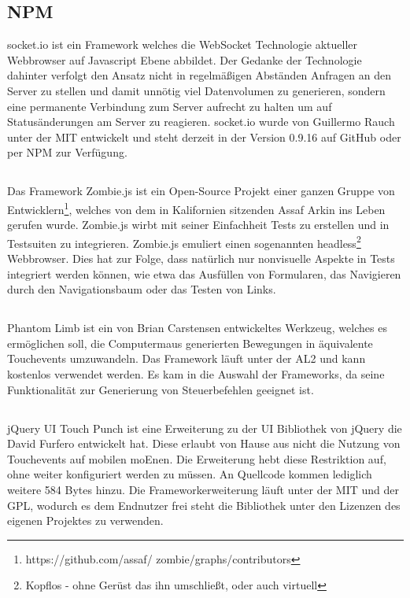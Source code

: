 	\subsection{NPM }
	socket.io ist ein \Gls{Framework} welches die WebSocket Technologie aktueller \Gls{Webbrowser} auf \Gls{Javascript} Ebene abbildet. Der Gedanke der Technologie dahinter verfolgt den Ansatz nicht in regelmäßigen Abständen Anfragen an den Server zu stellen und damit unnötig viel Datenvolumen zu generieren, sondern eine permanente Verbindung zum Server aufrecht zu halten um auf Statusänderungen am Server zu reagieren. socket.io wurde von Guillermo Rauch unter der \Gls{MIT} entwickelt und steht derzeit in der Version 0.9.16 auf GitHub oder per \Gls{NPM} zur Verfügung.
	
	\subsection{}
	Das \Gls{Framework} Zombie.js ist ein Open-Source Projekt einer ganzen Gruppe von Entwicklern\footnote{https://github.com/assaf/	zombie/graphs/contributors}, welches von dem in Kalifornien sitzenden Assaf Arkin ins Leben gerufen wurde. Zombie.js wirbt mit 	seiner Einfachheit \Gls{Test}s zu erstellen und in \Gls{Test}suiten zu integrieren. Zombie.js emuliert einen sogenannten headless\footnote{Kopflos - ohne Gerüst das ihn umschließt, oder auch virtuell} \Gls{Webbrowser}. Dies hat zur Folge, dass natürlich nur nonvisuelle Aspekte in \Gls{Test}s integriert werden können, wie etwa das Ausfüllen von Formularen, das Navigieren durch den Navigationsbaum oder das Testen von Links.

	\subsection{}
	Phantom Limb ist ein von Brian Carstensen entwickeltes Werkzeug, welches es ermöglichen soll, die \Gls{Computer}maus generierten Bewegungen in äquivalente \mbox{Touchevents} umzuwandeln. Das \Gls{Framework} läuft unter der \Gls{AL2} und kann kostenlos 	verwendet werden. Es kam in die Auswahl der \Gls{Framework}s, da seine Funktionalität zur Generierung von Steuerbefehlen geeignet ist.
	
	\subsection{}
	jQuery UI Touch Punch ist eine Erweiterung zu der UI Bibliothek von jQuery die David Furfero entwickelt hat. Diese erlaubt von 	Hause aus nicht die Nutzung von Touchevents auf mobilen \Gls{moEn}en. Die Erweiterung hebt diese Restriktion auf, ohne weiter konfiguriert werden zu müssen. An Quellcode kommen lediglich weitere 584 Bytes hinzu. Die \Gls{Framework}erweiterung läuft unter der MIT und der \Gls{GPL}, wodurch es dem Endnutzer frei steht die Bibliothek unter den Lizenzen des eigenen Projektes zu verwenden.
	
